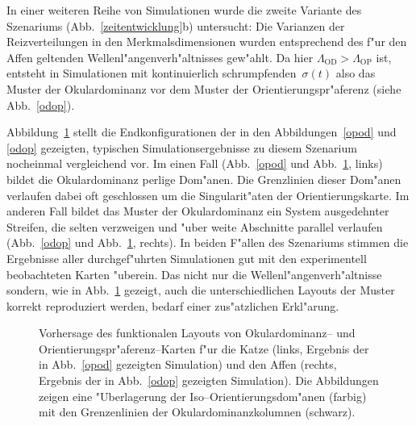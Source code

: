 In einer weiteren Reihe von Simulationen wurde die zweite Variante des
Szenariums (Abb.~\ref{zeitentwicklung}b) untersucht: Die Varianzen der
Reizverteilungen in den Merkmalsdimensionen wurden entsprechend des f"ur
den Affen geltenden Wellen\-l"angen\-ver\-h"altnisses gew"ahlt. Da hier
$\Lambda_{\text{OD}} > \Lambda_{\text{OP}}$ ist, entsteht in Simulationen
mit kontinuierlich schrumpfenden~$\sigma(t)$ also das Muster der
Okulardominanz vor dem Muster der Orientierungspr"aferenz (siehe
Abb.~\ref{odop}).

Abbildung~\ref{simres} stellt die Endkonfigurationen der in den
Abbildungen~\ref{opod} und \ref{odop} gezeigten, typischen
Simulationsergebnisse zu diesem Szenarium nocheinmal vergleichend vor.  Im
einen Fall (Abb.~\ref{opod} und Abb.~\ref{simres}, links) bildet die
Okulardominanz perlige Dom"anen. Die Grenzlinien dieser Dom"anen verlaufen
dabei oft geschlossen um die Singularit"aten der Orientierungskarte.  Im
anderen Fall bildet das Muster der Okulardominanz ein System ausgedehnter
Streifen, die selten verzweigen und "uber weite Abschnitte parallel
verlaufen (Abb.~\ref{odop} und Abb.~\ref{simres}, rechts).
In beiden F"allen des Szenariums stimmen die Ergebnisse aller durchgef"uhrten
Simulationen gut mit den experimentell beobachteten Karten "uberein. Das
nicht nur die Wellenl"angenverh"altnisse sondern, wie in Abb.~\ref{simres}
gezeigt, auch die unterschiedlichen Layouts der Muster korrekt reproduziert
werden, bedarf einer zus"atzlichen Erkl"arung.

\begin{figure}[t]
\begin{center}
\begin{minipage}[t]{6.2cm}
\end{minipage}
\hskip0.4cm 
\begin{minipage}[t]{6.2cm}
\end{minipage}
\end{center}
\caption{Vorhersage des funktionalen Layouts von Okulardominanz-- und 
Orientierungspr"aferenz--Karten f"ur die Katze (links, Ergebnis der in
Abb.~\ref{opod} gezeigten Simulation) und den Affen (rechts, Ergebnis der
in Abb.~\ref{odop} gezeigten Simulation).  Die Abbildungen zeigen eine
"Uberlagerung der Iso--Orientierungsdom"anen (farbig) mit den Grenzenlinien
der Okulardominanzkolumnen (schwarz).}
\label{simres}
\end{figure}


